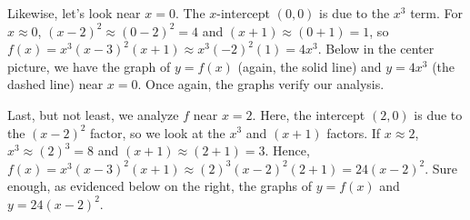 \documentclass{ximera}
\begin{document}
\medskip

Likewise, let's look near $x = 0$.  The $x$-intercept $(0,0)$ is due to the $x^3$ term.  For $x \approx 0$, $(x-2)^2 \approx (0-2)^2 = 4$ and $(x+1) \approx (0+1) = 1$, so $f(x) =  x^3 (x-3)^2 (x+1) \approx x^3 (-2)^2(1) = 4x^3$.  Below in the center picture, we have the graph of $y = f(x)$ (again, the solid line) and $y = 4x^3$ (the dashed line) near $x=0$.  Once again, the graphs verify our analysis.

\medskip

Last, but not least, we analyze $f$ near $x = 2$.  Here, the intercept $(2,0)$ is due to the $(x-2)^2$ factor, so we look at the $x^3$ and $(x+1)$ factors.  If $x \approx 2$, $x^3 \approx (2)^3 = 8$ and $(x+1) \approx (2+1) = 3$.  Hence,  $f(x) =  x^3 (x-3)^2 (x+1) \approx (2)^3 (x-2)^2 (2+1) = 24(x-2)^2$.  Sure enough, as evidenced below on the right, the graphs of $y = f(x)$ and $y = 24(x-2)^2$.

\medskip
\end{document}
